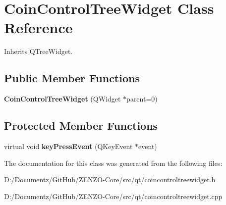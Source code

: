 \hypertarget{class_coin_control_tree_widget}{}\section{Coin\+Control\+Tree\+Widget Class Reference}
\label{class_coin_control_tree_widget}


Inherits Q\+Tree\+Widget.

\subsection*{Public Member Functions}
\begin{DoxyCompactItemize}
\item 
\mbox{\label{class_coin_control_tree_widget_a426fcbff6c4a6707d50148b281b2dc3f}} 
{\bfseries Coin\+Control\+Tree\+Widget} (Q\+Widget $\ast$parent=0)
\end{DoxyCompactItemize}
\subsection*{Protected Member Functions}
\begin{DoxyCompactItemize}
\item 
\mbox{\label{class_coin_control_tree_widget_a214c041952383bd6b8cb38fbccdd5c8c}} 
virtual void {\bfseries key\+Press\+Event} (Q\+Key\+Event $\ast$event)
\end{DoxyCompactItemize}


The documentation for this class was generated from the following files\+:\begin{DoxyCompactItemize}
\item 
D\+:/\+Documentz/\+Git\+Hub/\+Z\+E\+N\+Z\+O-\/\+Core/src/qt/coincontroltreewidget.\+h\item 
D\+:/\+Documentz/\+Git\+Hub/\+Z\+E\+N\+Z\+O-\/\+Core/src/qt/coincontroltreewidget.\+cpp\end{DoxyCompactItemize}
